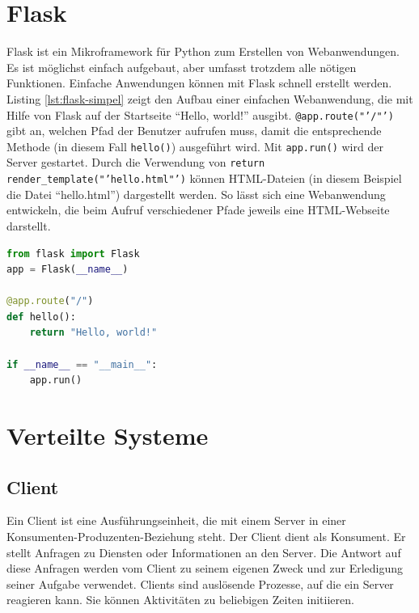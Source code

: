 

\section{Flask}\label{sec:flask}
Flask ist ein Mikroframework für Python zum Erstellen von Webanwendungen. Es ist
möglichst einfach aufgebaut, aber umfasst trotzdem alle nötigen Funktionen.
Einfache Anwendungen können mit Flask schnell erstellt werden. \cite{Flask2018}
Listing \ref{lst:flask-simpel} zeigt den Aufbau einer einfachen Webanwendung, die mit
Hilfe von Flask auf der Startseite "`Hello, world!"' ausgibt.
\texttt{@app.route("'/"')} gibt an, welchen Pfad der Benutzer aufrufen muss,
damit die entsprechende Methode (in diesem Fall \texttt{hello()}) ausgeführt
wird. Mit \texttt{app.run()} wird der Server gestartet. Durch die Verwendung von
\texttt{return render\_template("'hello.html"')} können HTML-Dateien (in diesem
Beispiel die Datei "`hello.html"') dargestellt werden. So lässt sich eine
Webanwendung entwickeln, die beim Aufruf verschiedener Pfade jeweils eine
HTML-Webseite darstellt.

\begin{lstlisting}[float, language=Python, frame=single, framexleftmargin=15pt,
style=algoBericht, label={lst:flask-simpel}, captionpos=b, caption={Einfache
Webanwendung, die auf der Startseite "`Hello, world!"' ausgibt}]
from flask import Flask
app = Flask(__name__)

@app.route("/")
def hello():
	return "Hello, world!"

if __name__ == "__main__":
	app.run()
\end{lstlisting}

\section{Verteilte Systeme}
\subsection{Client}
Ein Client ist eine Ausführungseinheit, die mit einem Server in einer
Konsumenten-Produzenten-Beziehung steht. Der Client dient als Konsument. Er
stellt Anfragen zu Diensten oder Informationen an den Server. Die Antwort auf
diese Anfragen werden vom Client zu seinem eigenen Zweck und zur Erledigung
seiner Aufgabe verwendet. Clients sind auslösende Prozesse, auf die ein Server
reagieren kann. Sie können Aktivitäten zu beliebigen Zeiten initiieren.
\cite{Bengel2015}

